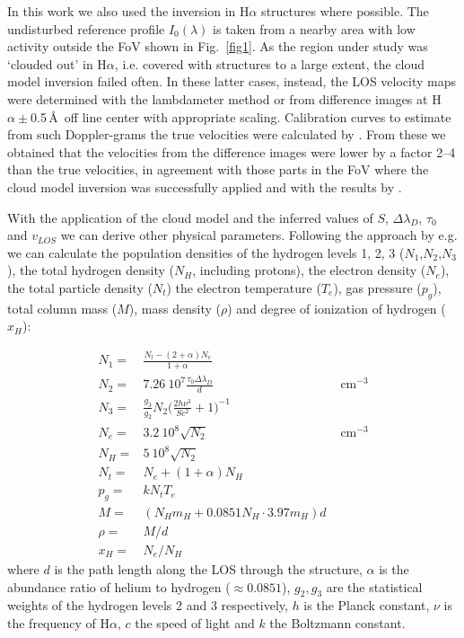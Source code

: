 In this work we also used the inversion in H$\alpha$ structures where possible. The undisturbed reference profile $I_0(\lambda)$ is taken from a nearby area with low activity outside the FoV shown in Fig.~\ref{fig1}. As the region under study was `clouded out' in H$\alpha$, i.e. covered with {structures} to a large extent, the cloud model inversion failed often. In these latter cases, instead, the LOS velocity maps were determined with the lambdameter method or from difference images at H$\alpha\pm$0.5\,\AA\ off line center with appropriate scaling. Calibration curves to estimate from such Doppler-grams the true velocities were calculated by \citet{1990SoPh..129..277G}. From these we obtained that the velocities from the difference images were lower by a factor 2--4 than the true velocities, in agreement with those parts in the FoV where the cloud model inversion was successfully applied and with the results by \citet{2004A&A...423.1133T}.

With the application of the cloud model and the inferred values of $S$, $\Delta \lambda_{D}$, $\tau_{0}$ and $v_{LOS}$ we can derive other physical parameters. Following the approach by e.g. \cite{tsiropoula97} we can calculate the population densities of the hydrogen levels 1, 2, 3 ($N_{1}$,$N_{2}$,$N_{3}$), the total hydrogen density ($N_{H}$, including protons), the electron density ($N_{e}$), the total particle density ($N_{t}$) the electron temperature ($T_{e}$), gas pressure ($p_{g}$), total column mass ($M$), mass density ($\rho$) and degree of ionization of hydrogen ($x_{H}$):

\begin{eqnarray}
N_{1}=& \frac{N_{t}-(2+\alpha)N_{e}}{1+\alpha} & \\
N_{2}= & 7.26~10^{7}\frac{\tau_{0}\Delta\lambda_{D}}{d} & \mbox{ cm}^{-3} \\
N_{3}=& \frac{g_{3}}{g_{2}}N_{2}\Big ({\frac{2h\nu^{3}}{Sc^{2}}+1}\Big )^{-1}&  \\
N_{e}=& 3.2~10^{8}\sqrt{N_{2}} & \mbox{ cm}^{-3} \\ 
N_{H}=& 5~10^{8}\sqrt{N_{2}}&  \\
N_{t}=& N_{e}+(1+\alpha)N_{H}  & \\
p_{g}=& kN_{t}T_{e}\\
M=& (N_{H}m_{H}+0.0851N_{H}\cdot3.97m_{H})d& \\
\rho=& M/d& \\
x_{H}=& N_{e}/N_{H}
\end{eqnarray}
where $d$ is the path length along the LOS through the structure, $\alpha$ is the abundance ratio of helium to hydrogen ($\approx 0.0851$), $g_{2},g_{3}$ are the statistical weights of the hydrogen levels 2 and 3 respectively, $h$ is the Planck constant, $\nu$ is the frequency of H$\alpha$, $c$ the speed of light  and $k$ the Boltzmann constant.

